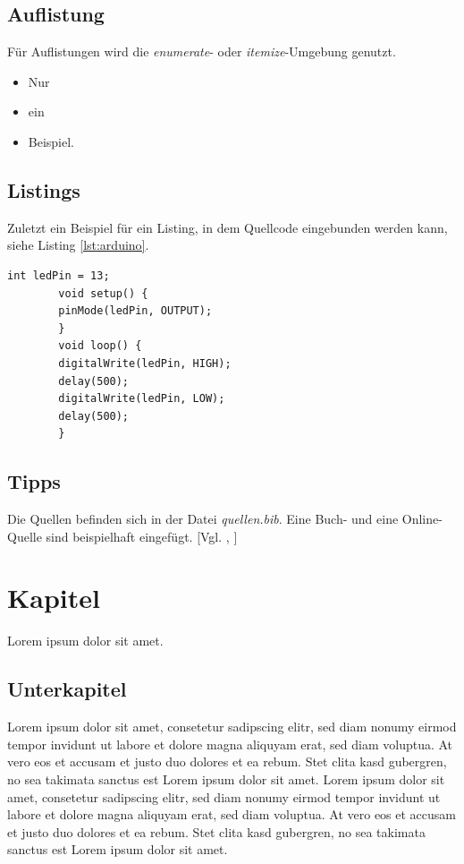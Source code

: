 \documentclass[12pt,a4paper,bibliography=totocnumbered,listof=totocnumbered]{scrartcl}
\begin{document}
    \subsection{Auflistung}
    Für Auflistungen wird die \textit{enumerate}- oder \textit{itemize}-Umgebung genutzt.

    \begin{itemize}
        \item Nur
        \item ein
        \item Beispiel.
    \end{itemize}

    \subsection{Listings}
    Zuletzt ein Beispiel für ein Listing, in dem Quellcode eingebunden werden kann, siehe Listing \ref{lst:arduino}.

    \vspace{1em}
    \begin{lstlisting}[caption=Arduino Beispielprogramm, label=lst:arduino]
        int ledPin = 13;
        void setup() {
        pinMode(ledPin, OUTPUT);
        }
        void loop() {
        digitalWrite(ledPin, HIGH);
        delay(500);
        digitalWrite(ledPin, LOW);
        delay(500);
        }
    \end{lstlisting}

    \subsection{Tipps}
    Die Quellen befinden sich in der Datei \textit{quellen.bib}. Eine Buch- und eine Online-Quelle sind beispielhaft eingefügt. [Vgl. \cite{buch}, \cite{online}]

    \pagebreak

    \section{Kapitel}
    Lorem ipsum dolor sit amet.

    \subsection{Unterkapitel}
    Lorem ipsum dolor sit amet, consetetur sadipscing elitr, sed diam nonumy eirmod tempor invidunt ut labore et dolore magna aliquyam erat, sed diam voluptua. At vero eos et accusam et justo duo dolores et ea rebum. Stet clita kasd gubergren, no sea takimata sanctus est Lorem ipsum dolor sit amet. Lorem ipsum dolor sit amet, consetetur sadipscing elitr, sed diam nonumy eirmod tempor invidunt ut labore et dolore magna aliquyam erat, sed diam voluptua. At vero eos et accusam et justo duo dolores et ea rebum. Stet clita kasd gubergren, no sea takimata sanctus est Lorem ipsum dolor sit amet.
\end{document}
